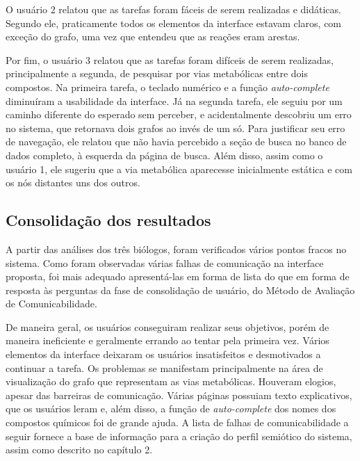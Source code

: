 \indent O usuário 2 relatou que as tarefas foram fáceis de serem realizadas e didáticas. Segundo ele, praticamente todos os elementos da interface estavam claros, com exceção do grafo, uma vez que entendeu que as reações eram arestas.

\indent Por fim, o usuário 3 relatou que as tarefas foram difíceis de serem realizadas, principalmente a segunda, de pesquisar por vias metabólicas entre dois compostos. Na primeira tarefa, o teclado numérico e a função \textit{auto-complete} diminuíram a usabilidade da interface. Já na segunda tarefa, ele seguiu por um caminho diferente do esperado sem perceber, e acidentalmente descobriu um erro no sistema, que retornava dois grafos ao invés de um só. Para justificar seu erro de navegação, ele relatou que não havia percebido a seção de busca no banco de dados completo, à esquerda da página de busca. Além disso, assim como o usuário 1, ele sugeriu que a via metabólica aparecesse inicialmente estática e com os nós distantes uns dos outros.

\subsection{Consolidação dos resultados}

\indent A partir das análises dos três biólogos, foram verificados vários pontos fracos no sistema. Como foram observadas várias falhas de comunicação na interface proposta, foi mais adequado apresentá-las em forma de lista do que em forma de resposta às perguntas da fase de consolidação de usuário, do Método de Avaliação de Comunicabilidade.

\indent De maneira geral, os usuários conseguiram realizar seus objetivos, porém de maneira ineficiente e geralmente errando ao tentar pela primeira vez. Vários elementos da interface deixaram os usuários insatisfeitos e desmotivados a continuar a tarefa. Os problemas se manifestam principalmente na área de visualização do grafo que representam as vias metabólicas. Houveram elogios, apesar das barreiras de comunicação. Várias páginas possuiam texto explicativos, que os usuários leram e, além disso, a função de \textit{auto-complete} dos nomes dos compostos químicos foi de grande ajuda. A lista de falhas de comunicabilidade a seguir fornece a base de informação para a criação do perfil semiótico do sistema, assim como descrito no capítulo 2.


